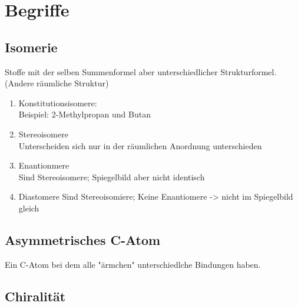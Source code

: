 
\section{Begriffe} \label{sec:begriffe}
\subsection{Isomerie}
Stoffe mit der selben Summenformel aber unterschiedlicher Strukturformel. (Andere räumliche Struktur)
\begin{enumerate}
    \item Konstitutionsisomere: \\
        Beispiel: 2-Methylpropan und Butan

    \item Stereoisomere \\
        Unterscheiden sich nur in der räumlichen Anordnung unterschieden
    \item Enantionmere \\
        Sind Stereoisomere; Spiegelbild aber nicht identisch
    \item Diastomere
        Sind Stereoisomiere; Keine Enantiomere -> nicht im Spiegelbild gleich

\end{enumerate}
\subsection{Asymmetrisches C-Atom}
Ein C-Atom bei dem alle "ärmchen" unterschiedlche Bindungen haben.

\subsection{Chiralität}

